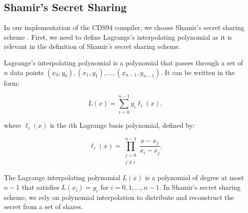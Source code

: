 \subsection{Shamir's Secret Sharing}\label{sec:sss}
In our implementation of the CDS94 compiler, we choose Shamir's secret sharing scheme 
\cite{DBLP:journals/cacm/Shamir79}. First, we need to define Lagrange's interpolating polynomial 
as it is relevant in the definition of Shamir's secret sharing scheme.

\begin{definition}\label{def:lagrange}
    Lagrange's interpolating polynomial is a polynomial that passes through a set of 
    $n$ data points $(x_0, y_0), (x_1, y_1), \ldots, (x_{n-1}, y_{n-1})$. It can be written in the 
    form:
    
    $$
    L(x) = \sum_{i=0}^{n-1} y_i \ell_i(x),
    $$
    
    where $\ell_i(x)$ is the $i$th Lagrange basis polynomial, defined by:
    
    $$
    \ell_i(x) = \prod_{\substack{j=0 \\ j\neq i}}^{n-1} \frac{x - x_j}{x_i - x_j}.
    $$
    
    The Lagrange interpolating polynomial $L(x)$ is a polynomial of degree at most 
    $n-1$ that satisfies $L(x_i) = y_i$ for $i = 0, 1, \ldots, n-1$. In Shamir's secret sharing 
    scheme, we rely on polynomial interpolation to distribute and 
    reconstruct the secret from a set of shares. 
\end{definition}

